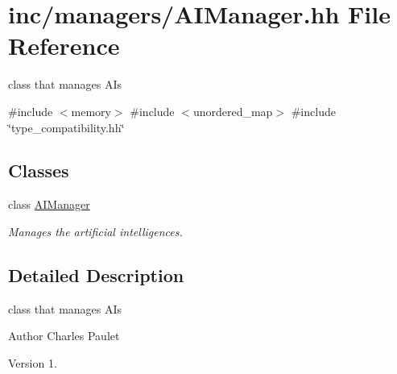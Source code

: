 \hypertarget{AIManager_8hh}{}\section{inc/managers/\+A\+I\+Manager.hh File Reference}
\label{AIManager_8hh}


class that manages A\+Is  


{\ttfamily \#include $<$memory$>$}\newline
{\ttfamily \#include $<$unordered\+\_\+map$>$}\newline
{\ttfamily \#include \char`\"{}type\+\_\+compatibility.\+hh\char`\"{}}\newline
\subsection*{Classes}
\begin{DoxyCompactItemize}
\item 
class \hyperlink{classAIManager}{A\+I\+Manager}
\begin{DoxyCompactList}\small\item\em Manages the artificial intelligences. \end{DoxyCompactList}\end{DoxyCompactItemize}


\subsection{Detailed Description}
class that manages A\+Is 

\begin{DoxyAuthor}{Author}
Charles Paulet 
\end{DoxyAuthor}
\begin{DoxyVersion}{Version}
1. 
\end{DoxyVersion}
